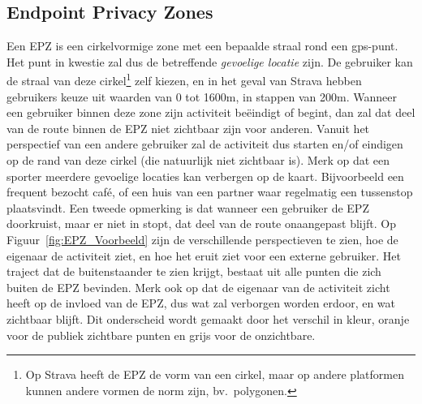 \subsection{Endpoint Privacy Zones}\label{sec:EPZ}
Een \ac{EPZ} is een cirkelvormige zone met een bepaalde straal rond een
\ac{gps}-punt. Het punt in kwestie zal dus de betreffende \textit{gevoelige
    locatie} zijn. De gebruiker kan de straal van deze cirkel\footnote{Op Strava
    heeft de \ac{EPZ} de vorm van een cirkel, maar op andere platformen kunnen
    andere vormen de norm zijn, bv.\ polygonen.} zelf kiezen, en in het geval van
Strava hebben gebruikers keuze uit waarden van 0 tot 1600m, in stappen van
200m. Wanneer een gebruiker binnen deze zone zijn activiteit beëindigt of
begint, dan zal dat deel van de route binnen de \ac{EPZ} niet zichtbaar zijn
voor anderen. Vanuit het perspectief van een andere gebruiker zal de activiteit
dus starten en/of eindigen op de rand van deze cirkel (die natuurlijk niet
zichtbaar is). Merk op dat een sporter meerdere gevoelige locaties kan
verbergen op de kaart. Bijvoorbeeld een frequent bezocht café, of een huis van
een partner waar regelmatig een tussenstop plaatsvindt. Een tweede opmerking is
dat wanneer een gebruiker de \ac{EPZ} doorkruist, maar er niet in stopt, dat
deel van de route onaangepast blijft. Op Figuur~\ref{fig:EPZ_Voorbeeld} zijn de
verschillende perspectieven te zien, hoe de eigenaar de activiteit ziet, en hoe
het eruit ziet voor een externe gebruiker. Het traject dat de buitenstaander te
zien krijgt, bestaat uit alle punten die zich buiten de \ac{EPZ} bevinden. Merk
ook op dat de eigenaar van de activiteit zicht heeft op de invloed van de
\ac{EPZ}, dus wat zal verborgen worden erdoor, en wat zichtbaar blijft. Dit
onderscheid wordt gemaakt door het verschil in kleur, oranje voor de publiek
zichtbare punten en grijs voor de onzichtbare.
